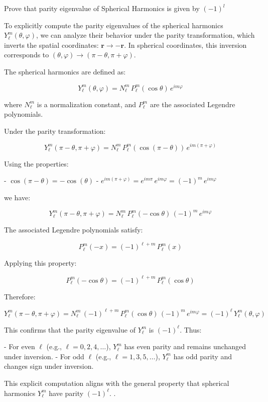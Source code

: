 \documentclass[10pt]{article}
\begin{document}
\begin{prob}Prove that parity eigenvalue of Spherical Harmonics is given by $(-1)^{l}$ 
	\end{prob} 
	\begin{solu}
		\begin{small} 
To explicitly compute the parity eigenvalues of the spherical harmonics \( Y_\ell^m(\theta, \varphi) \), we can analyze their behavior under the parity transformation, which inverts the spatial coordinates: \( \mathbf{r} \rightarrow -\mathbf{r} \). In spherical coordinates, this inversion corresponds to \( (\theta, \varphi) \rightarrow (\pi - \theta, \pi + \varphi) \).

The spherical harmonics are defined as:

\[ Y_\ell^m(\theta, \varphi) = N_\ell^m \, P_\ell^m(\cos \theta) \, e^{i m \varphi} \]

where \( N_\ell^m \) is a normalization constant, and \( P_\ell^m \) are the associated Legendre polynomials.

Under the parity transformation:

\[ Y_\ell^m(\pi - \theta, \pi + \varphi) = N_\ell^m \, P_\ell^m(\cos(\pi - \theta)) \, e^{i m (\pi + \varphi)} \]

Using the properties:

- \( \cos(\pi - \theta) = -\cos(\theta) \)
- \( e^{i m (\pi + \varphi)} = e^{i m \pi} \, e^{i m \varphi} = (-1)^m \, e^{i m \varphi} \)

we have:

\[ Y_\ell^m(\pi - \theta, \pi + \varphi) = N_\ell^m \, P_\ell^m(-\cos \theta) \, (-1)^m \, e^{i m \varphi} \]

The associated Legendre polynomials satisfy:

\[ P_\ell^m(-x) = (-1)^{\ell + m} \, P_\ell^m(x) \]

Applying this property:

\[ P_\ell^m(-\cos \theta) = (-1)^{\ell + m} \, P_\ell^m(\cos \theta) \]

Therefore:

\[ Y_\ell^m(\pi - \theta, \pi + \varphi) = N_\ell^m \, (-1)^{\ell + m} \, P_\ell^m(\cos \theta) \, (-1)^m \, e^{i m \varphi} = (-1)^\ell \, Y_\ell^m(\theta, \varphi) \]

This confirms that the parity eigenvalue of \( Y_\ell^m \) is \( (-1)^\ell \). Thus:

- For even \( \ell \) (e.g., \( \ell = 0, 2, 4, \ldots \)), \( Y_\ell^m \) has even parity and remains unchanged under inversion.
- For odd \( \ell \) (e.g., \( \ell = 1, 3, 5, \ldots \)), \( Y_\ell^m \) has odd parity and changes sign under inversion.

This explicit computation aligns with the general property that spherical harmonics \( Y_\ell^m \) have parity \( (-1)^\ell \).
\qedsymbol.
\end{small}
\end{solu}
\end{document}
